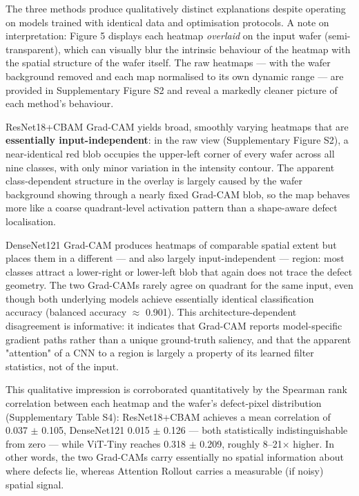 \documentclass[11pt,a4paper]{article}
\begin{document}
The three methods produce qualitatively distinct explanations despite operating on models trained with identical data and optimisation protocols. A note on interpretation: Figure 5 displays each heatmap \emph{overlaid} on the input wafer (semi-transparent), which can visually blur the intrinsic behaviour of the heatmap with the spatial structure of the wafer itself. The raw heatmaps --- with the wafer background removed and each map normalised to its own dynamic range --- are provided in Supplementary Figure S2 and reveal a markedly cleaner picture of each method's behaviour.

ResNet18+CBAM Grad-CAM yields broad, smoothly varying heatmaps that are \textbf{essentially input-independent}: in the raw view (Supplementary Figure S2), a near-identical red blob occupies the upper-left corner of every wafer across all nine classes, with only minor variation in the intensity contour. The apparent class-dependent structure in the overlay is largely caused by the wafer background showing through a nearly fixed Grad-CAM blob, so the map behaves more like a coarse quadrant-level activation pattern than a shape-aware defect localisation.

DenseNet121 Grad-CAM produces heatmaps of comparable spatial extent but places them in a different --- and also largely input-independent --- region: most classes attract a lower-right or lower-left blob that again does not trace the defect geometry. The two Grad-CAMs rarely agree on quadrant for the same input, even though both underlying models achieve essentially identical classification accuracy (balanced accuracy $\approx$ 0.901). This architecture-dependent disagreement is informative: it indicates that Grad-CAM reports model-specific gradient paths rather than a unique ground-truth saliency, and that the apparent "attention" of a CNN to a region is largely a property of its learned filter statistics, not of the input.

This qualitative impression is corroborated quantitatively by the Spearman rank correlation between each heatmap and the wafer's defect-pixel distribution (Supplementary Table S4): ResNet18+CBAM achieves a mean correlation of 0.037 $\pm$ 0.105, DenseNet121 0.015 $\pm$ 0.126 --- both statistically indistinguishable from zero --- while ViT-Tiny reaches 0.318 $\pm$ 0.209, roughly 8--21$\times$ higher. In other words, the two Grad-CAMs carry essentially no spatial information about where defects lie, whereas Attention Rollout carries a measurable (if noisy) spatial signal.
\end{document}
